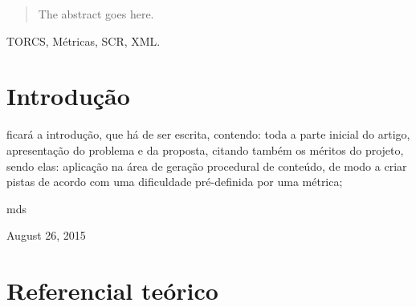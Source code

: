 \documentclass[conference]{IEEEtran}
\begin{document}




\maketitle

\begin{abstract}
The abstract goes here.
\end{abstract}

\begin{IEEEkeywords}
TORCS, Métricas, SCR, XML.
\end{IEEEkeywords}





%
\IEEEpeerreviewmaketitle



\section{Introdução}

 ficará a introdução, que há de ser escrita, contendo: toda a parte inicial do artigo, apresentação do problema e da proposta, citando também os méritos do projeto, sendo elas:  aplicação na área de geração procedural de conteúdo, de modo a criar pistas de acordo com uma dificuldade pré-definida por uma métrica;


\hfill mds
 
\hfill August 26, 2015

\section{Referencial teórico}
\end{document}
